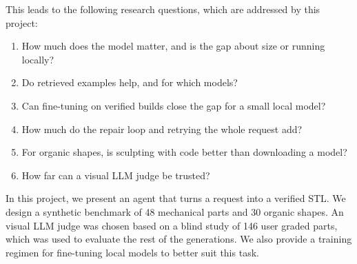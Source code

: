 
This leads to the following research questions, which are addressed by this project:

\begin{enumerate}
    \item How much does the model matter, and is the gap about size or running locally?
    \item Do retrieved examples help, and for which models?
    \item Can fine-tuning on verified builds close the gap for a small local model?
    \item How much do the repair loop and retrying the whole request add?
    \item For organic shapes, is sculpting with code better than downloading a model?
    \item How far can a visual LLM judge be trusted? 
\end{enumerate}


In this project, we present an agent that turns a request into a verified STL.
We design a synthetic benchmark of 48 mechanical parts and 30 organic shapes.
An visual LLM judge was chosen based on a blind study of 146 user graded parts, which was used to evaluate the rest of the generations.
We also provide a training regimen for fine-tuning local models to better suit this task.
